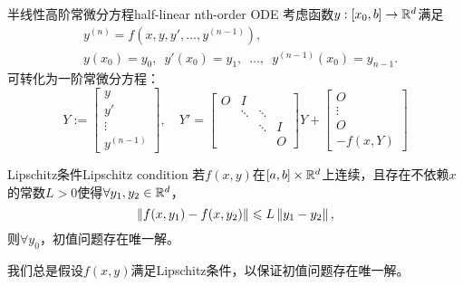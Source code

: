 \begin{definition}
    {半线性高阶常微分方程}{half-linear nth-order ODE}
    考虑函数$y:[x_0,b]\to\mathbb R^d$满足
    \begin{subequations}
        \begin{align}
            &y^{(n)}=f(x,y,y',\dots,y^{(n-1)}),\\
            &y(x_0)=y_0,\enspace y'(x_0)=y_1,\enspace\ldots,\enspace y^{(n-1)}(x_0)=y_{n-1}.
        \end{align}
    \end{subequations}
    可转化为一阶常微分方程：
    \begin{equation}
        Y:=\begin{bmatrix}
            y\\y'\\\vdots\\y^{(n-1)}
        \end{bmatrix},\quad
        Y'=\begin{bmatrix}
            O&I\\ &\ddots&\ddots\\ &&\ddots&I\\ &&&O
        \end{bmatrix}Y+\begin{bmatrix}
            O\\\vdots\\O\\-f(x,Y)
        \end{bmatrix}
    \end{equation}
\end{definition}

\begin{theorem}
    {Lipschitz条件}{Lipschitz condition}
    若$f(x,y)$在$[a,b]\times\mathbb R^d$上连续，且存在不依赖$x$的常数$L>0$使得$\forall y_1,y_2\in\mathbb R^d$，
    \begin{equation}
        \left\lVert f(x,y_1)-f(x,y_2)\right\rVert\leqslant L\left\lVert y_1-y_2\right\rVert,
    \end{equation}
    则$\forall y_0$，初值问题存在唯一解。
\end{theorem}

\begin{remark}
    我们总是假设$f(x,y)$满足Lipschitz条件，以保证初值问题存在唯一解。
\end{remark}

